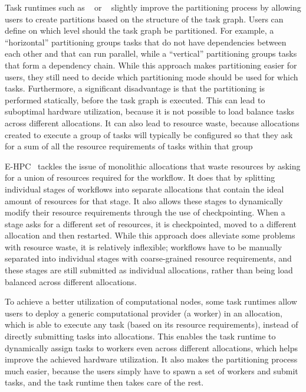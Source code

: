 Task runtimes such as \pegasus{}~\cite{pegasus} or \autosubmit~\cite{autosubmit} slightly improve
the partitioning process by allowing users to create partitions based on the structure of the
task graph. Users can define on which level should the task graph be partitioned. For example,
a ``horizontal'' partitioning groups tasks that do not have dependencies between each other and that
can run parallel, while a ``vertical'' partitioning groups tasks that form a dependency chain.
While this approach makes partitioning easier for users, they still need to decide which
partitioning mode should be used for which tasks. Furthermore, a significant disadvantage is
that the partitioning is performed statically, before the task graph is executed. This can lead
to suboptimal hardware utilization, because it is not possible to load balance tasks across
different allocations. It can also lead to resource waste, because allocations created to
execute a group of tasks will typically be configured so that they ask for a sum of all the
resource requirements of tasks within that group

\textsc{E-HPC}~\cite{ehpc} tackles the issue of monolithic allocations that waste resources by
asking for a union of resources required for the workflow. It does that by splitting individual
stages of workflows into separate allocations that contain the ideal amount of resources for that
stage. It also allows these stages to dynamically modify their resource requirements through the
use of checkpointing. When a stage asks for a different set of resources, it is checkpointed, moved
to a different allocation and then restarted. While this approach does alleviate some problems with
resource waste, it is relatively inflexible; workflows have to be manually separated into
individual stages with coarse-grained resource requirements, and these stages are still submitted
as individual allocations, rather than being load balanced across different allocations.

To achieve a better utilization of computational nodes, some task runtimes allow users to
deploy a generic computational provider (a worker) in an allocation, which is able to execute
any task (based on its resource requirements), instead of directly submitting tasks into
allocations. This enables the task runtime to dynamically assign tasks to workers even across
different allocations, which helps improve the achieved hardware utilization.
It also makes the partitioning process much easier, because the users simply have to spawn a set
of workers and submit tasks, and the task runtime then takes care of the rest.


